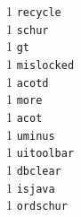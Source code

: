 \begin{footnotesize}
\vspace{-.153cm}
\begin{multicols}{3}
\noindent
\vspace{-.153cm} 1     \hspace{.2cm} {\tt recycle             }   \\ %
\vspace{-.153cm} 1     \hspace{.2cm} {\tt schur               }   \\ %
\vspace{-.153cm} 1     \hspace{.2cm} {\tt gt                  }   \\ %
\vspace{-.153cm} 1     \hspace{.2cm} {\tt mislocked           }   \\ %
\vspace{-.153cm} 1     \hspace{.2cm} {\tt acotd               }   \\ %
\vspace{-.153cm} 1     \hspace{.2cm} {\tt more                }   \\ %
\vspace{-.153cm} 1     \hspace{.2cm} {\tt acot                }   \\ %
\vspace{-.153cm} 1     \hspace{.2cm} {\tt uminus              }   \\ %
\vspace{-.153cm} 1     \hspace{.2cm} {\tt uitoolbar           }   \\ %
\vspace{-.153cm} 1     \hspace{.2cm} {\tt dbclear             }   \\ %
\vspace{-.153cm} 1     \hspace{.2cm} {\tt isjava              }   \\ %
\vspace{-.153cm} 1     \hspace{.2cm} {\tt ordschur            }   \\ %

\end{multicols}
\end{footnotesize}
